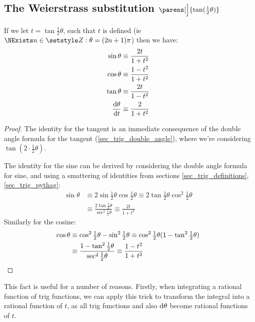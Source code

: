\subsection[The Weierstrass substitution
            \texorpdfstring{(\(\tan(\theta / 2)\))}{(tangent half-angle)}]
   {The Weierstrass substitution \boldmath\(\parens[\Big]{\tan(\tfrac 12 \theta)}\)}

\begin{theorem}
If we let \(t = \tan \tfrac 12 \theta\), such that \(t\) is defined (ie
\(\NExists n \in \Integers: \theta = (2n + 1)\pi\)) then we have:
\begin{align*}
\sin \theta &\equiv \dfrac{2t}{1 + t^2} \\
\cos \theta &\equiv \dfrac{1 - t^2}{1 + t^2} \\
\tan \theta &\equiv \dfrac{2t}{1 - t^2} \\
\dv<\theta>{t} &\equiv \dfrac 2{1 + t^2}
\end{align*}
\end{theorem}
\begin{proof}
The identity for the tangent is an immediate consequence of the double
angle formula for the tangent (\ref{sec_trig_double_angle}), where we're
considering \(\tan{(2 \cdot \frac 12 \theta)}\).

The identity for the sine can be derived by considering the double angle
formula for sine, and using a smattering of identities from sections
\ref{sec_trig_definitions}, \ref{sec_trig_pythag}:
\begin{align*}
\sin \theta &\equiv 2\sin \tfrac 12 \theta \cos\tfrac 12 \theta
    \equiv 2\tan \tfrac 12 \theta \cos^2 \tfrac 12 \theta \\
    &\equiv \frac{2\tan \tfrac 12 \theta}{\sec^2 \tfrac 12 \theta}
    \equiv \frac{2t}{1 + t^2}
\end{align*}
Similarly for the cosine:
\begin{align*}
\cos \theta
    &\equiv \cos^2 \tfrac 12 \theta - \sin^2 \tfrac 12 \theta
    \equiv \cos^2 \tfrac 12 \theta
        (1 - \tan^2 \tfrac 12 \theta) \\
    &\equiv \frac{1 - \tan^2 \tfrac 12 \theta}
                 {\sec^2 \tfrac 12 \theta}
    \equiv \frac{1 - t^2}{1 + t^2} \qedhere
\end{align*}
\end{proof}

This fact is useful for a number of reasons. Firstly, when integrating a
rational function of trig functions, we can apply this trick to transform
the integral into a rational function of \(t\), as all trig functions and
also \(\mathrm d \theta\) become rational functions of \(t\).

